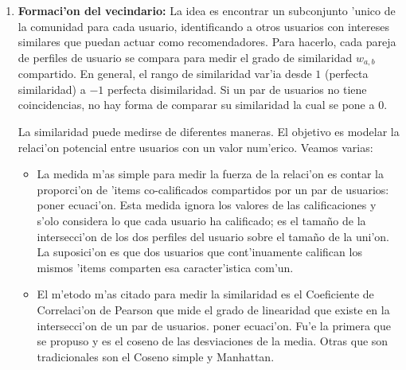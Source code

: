 \documentclass[11pt]{article}
\begin{document}
\begin{enumerate}
\item \textbf{Formaci'on del vecindario:} La idea es encontrar un subconjunto 'unico de la comunidad para cada usuario, identificando a otros usuarios con intereses similares que puedan actuar como recomendadores. Para hacerlo, cada pareja de perfiles de usuario se compara para medir el grado de similaridad $w_{a,b}$ compartido. En general, el rango de similaridad var'ia desde $1$ (perfecta similaridad) a $-1$ perfecta disimilaridad. Si un par de usuarios no tiene coincidencias, no hay forma de comparar su similaridad la cual se pone a $0$.

La similaridad puede medirse de diferentes maneras. El objetivo es modelar la relaci'on potencial entre usuarios con un valor num'erico.  Veamos varias:

\begin{itemize}
\item La medida m'as simple para medir la fuerza de la relaci'on es contar la proporci'on de 'items co-calificados compartidos por un par de usuarios: poner ecuaci'on. Esta medida ignora los valores de las calificaciones y s'olo considera lo que cada usuario ha calificado; es el tama\~{n}o de la intersecci'on de los dos perfiles del usuario sobre el tama\~{n}o de la uni'on. La suposici'on es que dos usuarios que cont'inuamente califican los mismos 'items comparten esa caracter'istica com'un.
\item El m'etodo m'as citado para medir la similaridad es el Coeficiente de Correlaci'on de Pearson que mide el grado de linearidad que existe en la intersecci'on de un par de usuarios. poner ecuaci'on. Fu'e la primera que se propuso y es el coseno de las desviaciones de la media. Otras que son tradicionales son el Coseno simple y Manhattan.


\end{itemize}
\end{enumerate}
\end{document}
